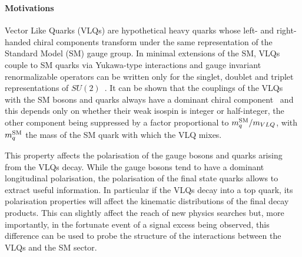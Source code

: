 \subsubsection{}

\paragraph*{Motivations}

Vector Like Quarks (VLQs) are hypothetical heavy quarks whose left- and right-handed chiral components transform under the same representation of the Standard Model (SM) gauge group. 
In minimal extensions of the SM, VLQs couple to SM quarks via Yukawa-type interactions and gauge invariant renormalizable operators can be written only for the singlet, doublet and triplet representations of $SU(2)$~\cite{delAguila:2000rc}. It can be shown that the couplings of the VLQs with the SM bosons and quarks always have a dominant chiral component~\cite{delAguila:2000rc,Buchkremer:2013bha} and this depends only on whether their weak isospin is integer or half-integer, the other component being suppressed by a factor proportional to $m_q^{\rm SM}/m_{VLQ}$, with $m_q^{\rm SM}$ the mass of the SM quark with which the VLQ mixes.

This property affects the polarisation of the gauge bosons and quarks arising from the VLQs decay. While the gauge bosons tend to have a dominant longitudinal polarisation, the polarisation of the final state quarks allows to extract useful information.
In particular if the VLQs decay into a top quark, its polarisation properties will affect the kinematic distributions of the final decay products. This can slightly affect the reach of new physics searches but, more importantly, in the fortunate event of a signal excess being observed, this difference can be used to probe the structure of the interactions between the VLQs and the SM sector.

